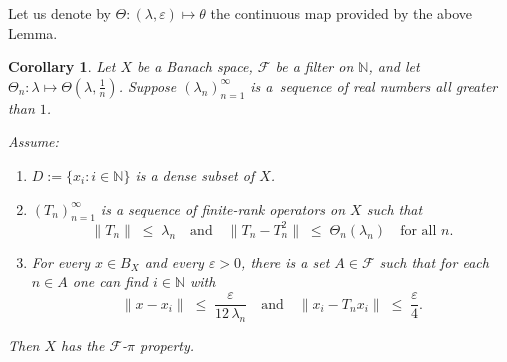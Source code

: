 \documentclass[12pt,fleqn]{amsart}
\newcommand{\FF}{\mathscr{F}}
\newtheorem{corollary}[theorem]{Corollary}
\theoremstyle{definition}
\theoremstyle{remark}
\begin{document}
Let us denote by $\Theta\colon(\lambda,\varepsilon)\mapsto \theta$ the continuous map provided by the above Lemma. 
\begin{corollary}\label{cor:Fpi-from-Tn}
Let $X$ be a Banach space, $\FF$ be a filter on $\mathbb{N}$, and let $\Theta_n \colon \lambda \mapsto \Theta(\lambda, \frac1n)$. Suppose $(\lambda_n)_{n=1}^\infty$ is a~sequence of real numbers all greater than $1$. 

Assume:
\begin{enumerate}
    \item $D := \{x_i : i \in \mathbb{N}\}$ is a dense subset of $X$.
    \item $(T_n)_{n=1}^\infty$ is a sequence of finite-rank operators on $X$ such that
    \[
    \|T_n\|\;\leqslant\;\lambda_n 
    \quad\text{and}\quad
    \|T_n - T_n^2\|\;\leqslant\;\Theta_n(\lambda_n) \quad\text{for all }n.
    \]
    \item For every $x \in B_X$ and every $\varepsilon>0$, there is a set $A \in \FF$ such that for each $n\in A$ one can find $i\in \mathbb{N}$ with
    \begin{equation}\label{eq:approx-dense}
        \|x - x_i\|\;\leqslant\; \frac{\varepsilon}{12\,\lambda_n}
        \quad\text{and}\quad
        \|x_i - T_n x_i\|\;\leqslant\;\frac\varepsilon4.
    \end{equation}    
\end{enumerate}
Then $X$ has the $\FF$-$\pi$ property.
\end{corollary}
\end{document}
